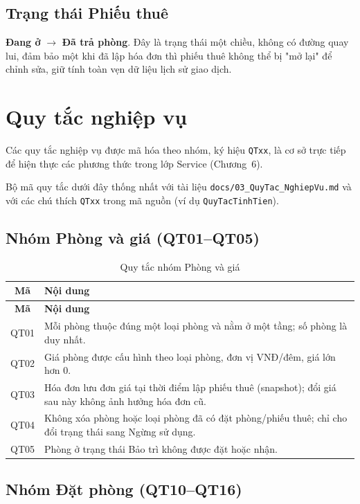 \documentclass[14pt]{report}
\begin{document}
\subsection{Trạng thái Phiếu thuê}

\textbf{Đang ở} $\to$ \textbf{Đã trả phòng}. Đây là trạng thái một chiều, không có đường quay lui, đảm bảo một khi đã lập hóa đơn thì phiếu thuê không thể bị "mở lại" để chỉnh sửa, giữ tính toàn vẹn dữ liệu lịch sử giao dịch.

\section{Quy tắc nghiệp vụ}

Các quy tắc nghiệp vụ được mã hóa theo nhóm, ký hiệu \texttt{QTxx}, là cơ sở trực tiếp để hiện thực các phương thức trong lớp Service (Chương~6).

Bộ mã quy tắc dưới đây thống nhất với tài liệu \texttt{docs/03\_QuyTac\_NghiepVu.md} và với các chú thích \texttt{QTxx} trong mã nguồn (ví dụ \texttt{QuyTacTinhTien}).

\subsection{Nhóm Phòng và giá (QT01--QT05)}

\begin{longtable}{|c|p{12cm}|}
\caption{Quy tắc nhóm Phòng và giá}\\\hline
\textbf{Mã} & \textbf{Nội dung}\\\hline
\endfirsthead
\hline \textbf{Mã} & \textbf{Nội dung}\\\hline
\endhead
QT01 & Mỗi phòng thuộc đúng một loại phòng và nằm ở một tầng; số phòng là duy nhất. \\\hline
QT02 & Giá phòng được cấu hình theo loại phòng, đơn vị VNĐ/đêm, giá lớn hơn 0. \\\hline
QT03 & Hóa đơn lưu đơn giá tại thời điểm lập phiếu thuê (snapshot); đổi giá sau này không ảnh hưởng hóa đơn cũ. \\\hline
QT04 & Không xóa phòng hoặc loại phòng đã có đặt phòng/phiếu thuê; chỉ cho đổi trạng thái sang Ngừng sử dụng. \\\hline
QT05 & Phòng ở trạng thái Bảo trì không được đặt hoặc nhận. \\\hline
\end{longtable}

\subsection{Nhóm Đặt phòng (QT10--QT16)}
\end{document}

